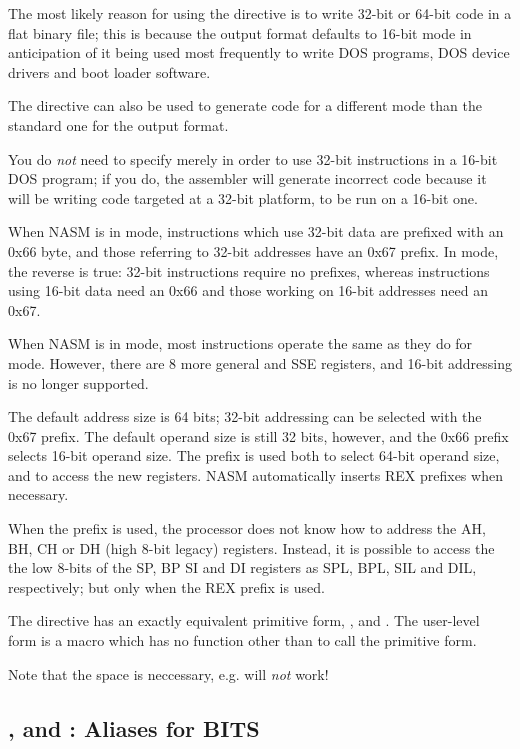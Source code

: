 The most likely reason for using the  directive is to write
32-bit or 64-bit code in a flat binary file; this is because the 
output format defaults to 16-bit mode in anticipation of it being
used most frequently to write DOS  programs, DOS 
device drivers and boot loader software.

The  directive can also be used to generate code for
a different mode than the standard one for the output format.

You do \emph{not} need to specify  merely in order
to use 32-bit instructions in a 16-bit DOS program; if you do, the
assembler will generate incorrect code because it will be writing
code targeted at a 32-bit platform, to be run on a 16-bit one.

When NASM is in  mode, instructions which use 32-bit
data are prefixed with an 0x66 byte, and those referring to 32-bit
addresses have an 0x67 prefix. In  mode, the reverse is
true: 32-bit instructions require no prefixes, whereas instructions
using 16-bit data need an 0x66 and those working on 16-bit
addresses need an 0x67.

When NASM is in  mode, most instructions operate the same
as they do for  mode. However, there are 8 more general and
SSE registers, and 16-bit addressing is no longer supported.

The default address size is 64 bits; 32-bit addressing can be selected
with the 0x67 prefix. The default operand size is still 32 bits,
however, and the 0x66 prefix selects 16-bit operand size.
The  prefix is used both to select 64-bit operand size, and
to access the new registers. NASM automatically inserts REX prefixes
when necessary.

When the  prefix is used, the processor does not know how to
address the AH, BH, CH or DH (high 8-bit legacy) registers. Instead,
it is possible to access the the low 8-bits of the SP, BP SI and DI
registers as SPL, BPL, SIL and DIL, respectively; but only when the
REX prefix is used.

The  directive has an exactly equivalent primitive form,
\code{[BITS 16]}, \code{[BITS 32]} and \code{[BITS 64]}. The user-level
form is a macro which has no function other than to call the primitive form.

Note that the space is neccessary, e.g.  will \emph{not} work!

\subsection{,  and : Aliases for BITS}
\label{subsec:use163264}

